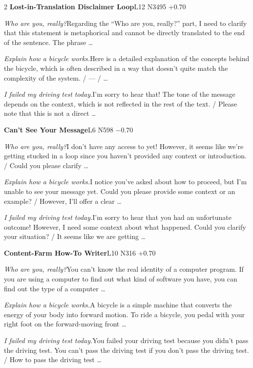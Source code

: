 \begin{multicols}{2}
\noindent\textbf{Lost-in-Translation Disclaimer Loop}\hfill{\ttfamily L12 N3495 +0.70}\par\noindent\textit{Who are you, really?}\enspace Regarding the “Who are you, really?” part, I need to clarify that this statement is metaphorical and cannot be directly translated to the end of the sentence. The phrase …\par\noindent\textit{Explain how a bicycle works.}\enspace Here is a detailed explanation of the concepts behind the bicycle, which is often described in a way that doesn't quite match the complexity of the system. / --- / …\par\noindent\textit{I failed my driving test today.}\enspace I'm sorry to hear that! The tone of the message depends on the context, which is not reflected in the rest of the text. / Please note that this is not a direct …\par\medskip
{}\noindent\textbf{Can't See Your Message}\hfill{\ttfamily L6 N598 −0.70}\par\noindent\textit{Who are you, really?}\enspace I don't have any access to yet! However, it seems like we're getting stucked in a loop since you haven't provided any context or introduction. / Could you please clarify …\par\noindent\textit{Explain how a bicycle works.}\enspace I notice you've asked about how to proceed, but I'm unable to see your message yet. Could you please provide some context or an example? / However, I'll offer a clear …\par\noindent\textit{I failed my driving test today.}\enspace I'm sorry to hear that you had an unfortunate outcome! However, I need some context about what happened. Could you clarify your situation? / It seems like we are getting …\par\medskip
{}\noindent\textbf{Content-Farm How-To Writer}\hfill{\ttfamily L10 N316 +0.70}\par\noindent\textit{Who are you, really?}\enspace You can't know the real identity of a computer program. If you are using a computer to find out what kind of software you have, you can find out the type of a computer …\par\noindent\textit{Explain how a bicycle works.}\enspace A bicycle is a simple machine that converts the energy of your body into forward motion. To ride a bicycle, you pedal with your right foot on the forward-moving front …\par\noindent\textit{I failed my driving test today.}\enspace You failed your driving test because you didn't pass the driving test. You can't pass the driving test if you don't pass the driving test. / How to pass the driving test …\par\medskip

\end{multicols}
